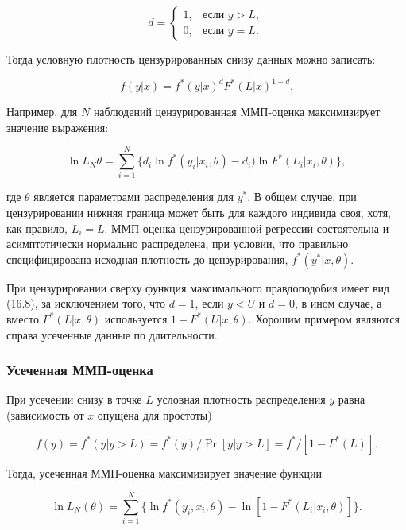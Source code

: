 \begin{equation}
d=
\begin{cases}
1, & \text{если $y>L$}, \\
0, & \text{если $y=L$}.
\end{cases}
\end{equation}


Тогда условную плотность цензурированных снизу данных можно записать:

\begin{equation}
f(y|x)=f^{*}(y|x)^{d}F^{*}(L|x)^{1-d}.
\end{equation}



Например, для $N$ наблюдений цензурированная ММП-оценка максимизирует значение выражения:

\begin{equation}
\ln{ L_N{\theta}}=\sum_{i=1}^{N} \lbrace{d_i}\ln{ f^{*}(y_i|x_i,\theta)-d_i)\ln{ F^{*}}(L_i|x_i,\theta)\rbrace} ,
\end{equation}


где $\theta$ является параметрами распределения для $y^* $. В общем случае, при цензурировании нижняя граница может быть для каждого индивида своя, хотя, как правило, $L_i=L$. ММП-оценка цензурированной регрессии состоятельна и асимптотически нормально распределена, при условии, что правильно специфицирована исходная плотность до цензурирования, $f^{*}(y^* |x,\theta)$.

При цензурировании сверху функция максимального правдоподобия имеет вид (16.8), за исключением того, что $d=1$, если $y<U$ и $d=0$, в ином случае, а вместо $F^{*}(L|x,\theta)$ используется $1-F^{*}(U|x,\theta)$. Хорошим примером являются справа усеченные данные по длительности. 


\subsubsection*{Усеченная ММП-оценка}


При усечении снизу в точке $L$ условная плотность распределения $y$ равна (зависимость от $x$ опущена для простоты)


\[
f(y)= f^{*}(y|y>L)=f^{*}(y)/\Pr[ y|y>L] =f^{*}/[1-F^{*}(L)].
\]

Тогда, усеченная ММП-оценка максимизирует значение функции


\begin{equation}
\ln L_N(\theta) =\sum_{i=1}^N \lbrace \ln{ f^{*}(y_i,x_i,\theta)-\ln[1-F^{*}(L_i|x_i,\theta)]}\rbrace.
\end{equation}

